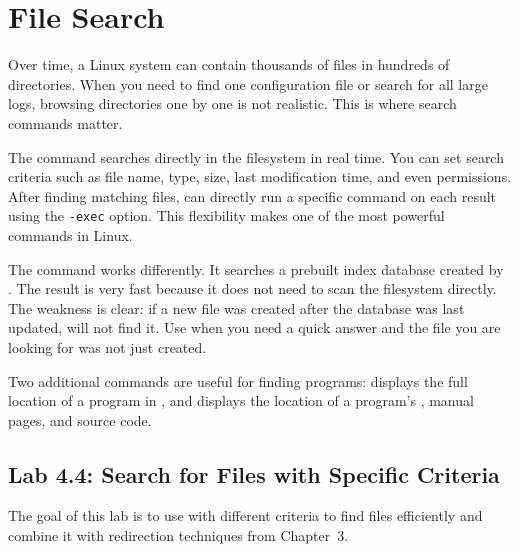 \section{File Search}
\label{sec:search}

Over time, a Linux system can contain thousands of files in hundreds of directories. When you need to find one configuration file or search for all large logs, browsing directories one by one is not realistic. This is where search commands matter.

The  command searches directly in the filesystem in real time. You can set search criteria such as file name, type, size, last modification time, and even permissions. After finding matching files,  can directly run a specific command on each result using the \texttt{-exec} option. This flexibility makes  one of the most powerful commands in Linux.

The  command works differently. It searches a prebuilt index database created by . The result is very fast because it does not need to scan the filesystem directly. The weakness is clear: if a new file was created after the database was last updated,  will not find it. Use  when you need a quick answer and the file you are looking for was not just created.

Two additional commands are useful for finding programs:  displays the full location of a program in , and  displays the location of a program's , manual pages, and source code.

\subsection*{Lab 4.4: Search for Files with Specific Criteria}

The goal of this lab is to use  with different criteria to find files efficiently and combine it with redirection techniques from Chapter~3.

